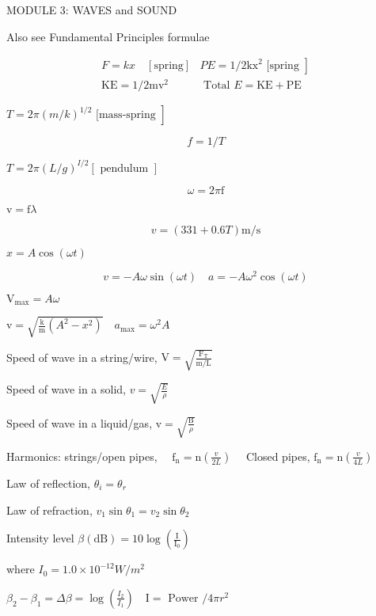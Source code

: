 \documentclass{extarticle}
\begin{document}
\begin{tcolorbox}[enhanced jigsaw,sharp corners,coltext=black,colback=BurntOrange!25!white,boxrule=pt,breakable,size=minimal]

MODULE 3: WAVES and SOUND

Also see Fundamental Principles formulae

\[
\begin{array}{ll}
F=k x \quad[\text {spring}] & \left.P E=1 / 2 \mathrm{kx}^{2} \text { [spring }\right] \\
\mathrm{KE}=1 / 2 \mathrm{mv}^{2} & \text { Total } E=\mathrm{KE}+\mathrm{PE}
\end{array}
\]

$\left.T=2 \pi(m / k)^{1 / 2} \text { [mass-spring }\right]$

\[
f=1 / T
\]

$T=2 \pi(L / g)^{I / 2}[\text { pendulum }]$

\[
\omega=2 \pi \mathrm{f}
\]

$\mathrm{v}=\mathrm{f} \lambda$

\[
v=(331+0.6 T) \mathrm{m} / \mathrm{s}
\]

$x=A \cos (\omega t)$

\[
v=-A \omega \sin (\omega t) \quad a=-A \omega^{2} \cos (\omega t)
\]

$\mathrm{V}_{\max }=A \omega$

$\mathrm{v}=\sqrt{\frac{\mathrm{k}}{\mathrm{m}}\left(A^{2}-x^{2}\right)} \quad a_{\max }=\omega^{2} A$

Speed of wave in a string/wire, $\mathrm{V}=\sqrt{\frac{\mathrm{F}_{\mathrm{T}}}{\mathrm{m} / \mathrm{L}}}$


Speed of wave in a solid, $v=\sqrt{\frac{E}{\rho}}$

Speed of wave in a liquid/gas, $\mathrm{v}=\sqrt{\frac{\mathrm{B}}{\rho}}$

Harmonics: strings/open pipes, $\quad \mathrm{f}_{\mathrm{n}}=\mathrm{n}\left(\frac{v}{2 L}\right) \quad$ Closed pipes, $\mathrm{f}_{\mathrm{n}}=\mathrm{n}\left(\frac{v}{4 L}\right)$

Law of reflection, $\theta_{i}=\theta_{r}$

Law of refraction, $v_{1} \sin \theta_{1}=v_{2} \sin \theta_{2}$

Intensity level $\beta(\mathrm{dB})=10 \log \left(\frac{\mathrm{I}}{\mathrm{I}_{0}}\right)$

where $I_{0}=1.0 \times 10^{-12} W / m^{2}$

$\beta_{2}-\beta_{1}=\Delta \beta=\log \left(\frac{I_{2}}{I_{1}}\right) \quad \mathrm{I}=\text { Power } / 4 \pi r^{2}$


\end{tcolorbox}
\end{document}
